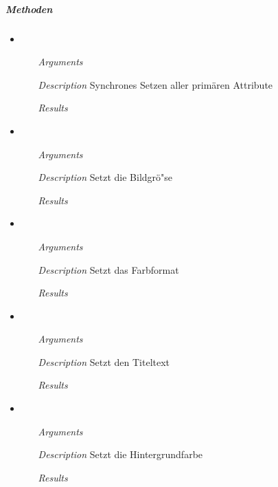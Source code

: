 
\newpage

\subparagraph{Methoden}
\begin{itemize}
  
\item {}
\begin{enumerate}
\item[\textit{Arguments}] 
\item[\textit{Description}] Synchrones Setzen aller prim\"aren
  Attribute
\item[\textit{Results}] 
\end{enumerate}

\item {}
\begin{enumerate}
\item[\textit{Arguments}] 
\item[\textit{Description}] Setzt die Bildgr\"o"se
\item[\textit{Results}] 
\end{enumerate}

\item {}
\begin{enumerate}
\item[\textit{Arguments}] 
\item[\textit{Description}] Setzt das Farbformat
\item[\textit{Results}] 
\end{enumerate}

\item {}
\begin{enumerate}
\item[\textit{Arguments}] 
\item[\textit{Description}] Setzt den Titeltext
\item[\textit{Results}] 
\end{enumerate}

\item {}
\begin{enumerate}
\item[\textit{Arguments}] 
\item[\textit{Description}] Setzt die Hintergrundfarbe
\item[\textit{Results}] 
\end{enumerate}


\end{itemize}
